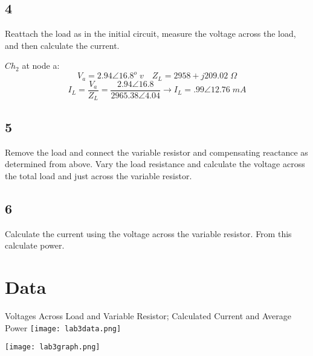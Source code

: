 \documentclass[11pt]{article}
\begin{document}
\subsection*{4}
Reattach the load as in the initial circuit, measure the voltage across the load, and then calculate the current.

$Ch_2$ at node a:
$$V_a =2.94 \angle 16.8^o \;v \quad Z_L = 2958 + j209.02 \; \Omega$$
$$I_L = \frac{V_a}{Z_L} = \frac{2.94 \angle 16.8}{2965.38 \angle 4.04} \rightarrow I_L = .99 \angle 12.76\; mA$$
\subsection*{5}
Remove the load and connect the variable resistor and compensating reactance as determined from above. Vary the load resistance and calculate the voltage across the total load and just across the variable resistor.

\subsection*{6}
Calculate the current using the voltage across the variable resistor. From this calculate power.

\section*{Data}
\begin{center}
    Voltages Across Load and Variable Resistor; Calculated Current and Average Power
    \texttt{[image: lab3data.png]}
\end{center}
\begin{center}
    \texttt{[image: lab3graph.png]}
\end{center}
\end{document}
